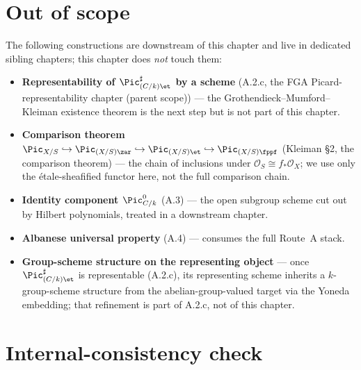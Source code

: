 \section{Out of scope}
\label{sec:relpic_out_of_scope}

The following constructions are downstream of this chapter and live in
dedicated sibling chapters; this chapter does \emph{not} touch them:
\begin{itemize}
  \item \textbf{Representability of \(\Pic^\sharp_{(C/k)\et}\) by a scheme}
    (A.2.c, the FGA Picard-representability chapter (parent scope)) --- the
    Grothendieck--Mumford--Kleiman existence theorem is the next step but is
    not part of this chapter.
  \item \textbf{Comparison theorem $\Pic_{X/S} \hookrightarrow
    \Pic_{(X/S)\zar} \hookrightarrow \Pic_{(X/S)\et} \hookrightarrow
    \Pic_{(X/S)\fppf}$} (Kleiman \S 2, the comparison theorem) --- the chain of inclusions
    under \(\mathcal{O}_S \cong f_*\mathcal{O}_X\); we use only the
    \'etale-sheafified functor here, not the full comparison chain.
  \item \textbf{Identity component \(\Pic^0_{C/k}\)} (A.3) --- the open subgroup
    scheme cut out by Hilbert polynomials, treated in a downstream chapter.
  \item \textbf{Albanese universal property} (A.4) --- consumes the full
    Route~A stack.
  \item \textbf{Group-scheme structure on the representing object} --- once
    \(\Pic^\sharp_{(C/k)\et}\) is representable (A.2.c), its representing scheme
    inherits a \(k\)-group-scheme structure from the abelian-group-valued
    target via the Yoneda embedding; that refinement is part of A.2.c, not
    of this chapter.
\end{itemize}

\section{Internal-consistency check}
\label{sec:relpic_consistency_check}

